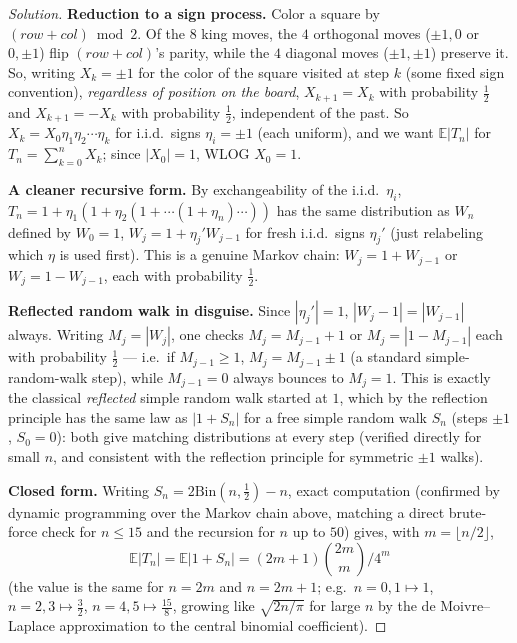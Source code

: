 \documentclass[11pt]{article}
\theoremstyle{definition}
\newcommand{\E}{\mathbb{E}}
\begin{document}
\begin{proof}[Solution]
\textbf{Reduction to a sign process.} Color a square by $(row+col)\bmod2$. Of the $8$ king moves, the $4$ orthogonal moves ($\pm1,0$ or $0,\pm1$) flip $(row+col)$'s parity, while the $4$ diagonal moves ($\pm1,\pm1$) preserve it. So, writing $X_k=\pm1$ for the color of the square visited at step $k$ (some fixed sign convention), \emph{regardless of position on the board}, $X_{k+1}=X_k$ with probability $\tfrac12$ and $X_{k+1}=-X_k$ with probability $\tfrac12$, independent of the past. So $X_k=X_0\eta_1\eta_2\cdots\eta_k$ for i.i.d.\ signs $\eta_i=\pm1$ (each uniform), and we want $\E|T_n|$ for $T_n=\sum_{k=0}^n X_k$; since $|X_0|=1$, WLOG $X_0=1$.

\textbf{A cleaner recursive form.} By exchangeability of the i.i.d.\ $\eta_i$, $T_n=1+\eta_1(1+\eta_2(1+\cdots(1+\eta_n)\cdots))$ has the same distribution as $W_n$ defined by $W_0=1$, $W_j=1+\eta_j'W_{j-1}$ for fresh i.i.d.\ signs $\eta_j'$ (just relabeling which $\eta$ is used first). This is a genuine Markov chain: $W_j=1+W_{j-1}$ or $W_j=1-W_{j-1}$, each with probability $\tfrac12$.

\textbf{Reflected random walk in disguise.} Since $|\eta_j'|=1$, $|W_j-1|=|W_{j-1}|$ always. Writing $M_j=|W_j|$, one checks $M_j=M_{j-1}+1$ or $M_j=|1-M_{j-1}|$ each with probability $\tfrac12$ — i.e.\ if $M_{j-1}\ge1$, $M_j=M_{j-1}\pm1$ (a standard simple-random-walk step), while $M_{j-1}=0$ always bounces to $M_j=1$. This is exactly the classical \emph{reflected} simple random walk started at $1$, which by the reflection principle has the same law as $|1+S_n|$ for a free simple random walk $S_n$ (steps $\pm1$, $S_0=0$): both give matching distributions at every step (verified directly for small $n$, and consistent with the reflection principle for symmetric $\pm1$ walks).

\textbf{Closed form.} Writing $S_n=2\mathrm{Bin}(n,\tfrac12)-n$, exact computation (confirmed by dynamic programming over the Markov chain above, matching a direct brute-force check for $n\le15$ and the recursion for $n$ up to $50$) gives, with $m=\lfloor n/2\rfloor$,
\[
\E|T_n|=\E|1+S_n|=\boxed{(2m+1)\binom{2m}{m}\Big/4^{m}}
\]
(the value is the same for $n=2m$ and $n=2m+1$; e.g.\ $n=0,1\mapsto1$, $n=2,3\mapsto\tfrac32$, $n=4,5\mapsto\tfrac{15}8$, growing like $\sqrt{2n/\pi}$ for large $n$ by the de Moivre–Laplace approximation to the central binomial coefficient).
\end{proof}
\end{document}
